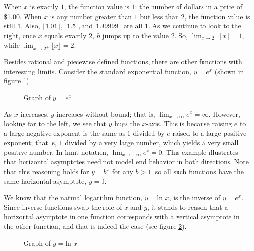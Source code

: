 When $x$ is exactly $1$, the function value is $1$: the number of dollars in a 
price of \$1.00. When $x$ is any number greater than $1$ but less than $2$, the 
function value is still $1$. Also, $ \lfloor 1.01 \rfloor, \lfloor 1.5 \rfloor, 
\text{and} \lfloor 1.99999 \rfloor$ are all $1$. As we continue to look to the 
right, once $x$ equals exactly $2$, $h$ jumps up to the value $2$. So, 
$ \lim_{x \rightarrow 2^-} \lfloor x \rfloor = 1 $, while 
$ \lim_{x \rightarrow 2^+} \lfloor x \rfloor = 2 $.

Besides rational and piecewise defined functions, there are other functions with 
interesting limits. Consider the standard exponential function, $y = e^x$ 
(shown in figure \ref{fig:exponent}).

\begin{figure}[htbp]
  \centering
  \caption{Graph of \( y = e^x \)}
  \label{fig:exponent}
\end{figure}	

As $x$ increases, $y$ increases without bound; that is, $\lim_{x \rightarrow 
\infty} e^x = \infty$. However, looking far to the left, we see that $y$ hugs the 
$x$-axis. This is because raising $e$ to a large negative exponent is the same as 
$1$ divided by $e$ raised to a large positive exponent; that is, $1$ divided by a 
very large number, which yields a very small positive number. In limit notation, 
$\lim_{x \rightarrow -\infty} e^x = 0$. This example illustrates that horizontal 
asymptotes need not model end behavior in both directions. Note that this reasoning 
holds for $y = b^x$ for any $b > 1$, so all such functions have the same horizontal 
asymptote, $y = 0$.

We know that the natural logarithm function, $y = \text{ln } x$, is the inverse of 
$y = e^x$. Since inverse functions swap the role of $x$ and $y$, it stands to 
reason that a horizontal asymptote in one function corresponds with a vertical 
asymptote in the other function, and that is indeed the case (see figure 
\ref{fig:log}).

\begin{figure}[htbp]
  \centering
  \caption{Graph of \( y = \text{ln } x \)}
  \label{fig:log}
\end{figure}	

